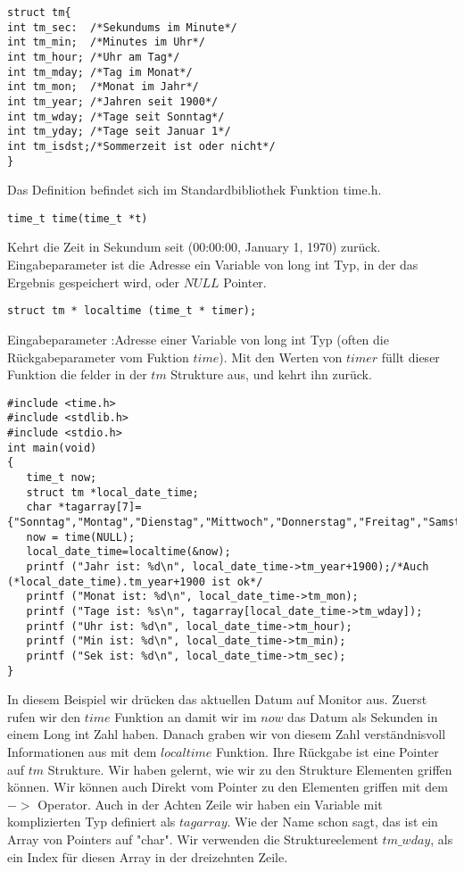 \documentclass{article}[12pt]
\newenvironment{myexampleblock}[1]{%
    \tcolorbox[beamer,%
    noparskip,breakable,
    colback=White,colframe=ForestGreen,%
    colbacklower=LimeGreen!75!White,%
    title=#1]}%
    {\endtcolorbox}
\begin{document}
\begin{myexampleblock}{Definition: \texttt{struct tm}}
\begin{lstlisting}
struct tm{
int tm_sec:  /*Sekundums im Minute*/
int tm_min;  /*Minutes im Uhr*/
int tm_hour; /*Uhr am Tag*/
int tm_mday; /*Tag im Monat*/
int tm_mon;  /*Monat im Jahr*/
int tm_year; /*Jahren seit 1900*/
int tm_wday; /*Tage seit Sonntag*/
int tm_yday; /*Tage seit Januar 1*/
int tm_isdst;/*Sommerzeit ist oder nicht*/
}
\end{lstlisting}
Das Definition befindet sich im Standardbibliothek Funktion time.h.
\end{myexampleblock}
\begin{myexampleblock}{Funktion:\texttt{time}}
\begin{lstlisting}
time_t time(time_t *t)
\end{lstlisting}
\vspace{-0.4cm}
Kehrt die Zeit in Sekundum seit (00:00:00, January 1, 1970) zurück.
Eingabeparameter ist die Adresse ein Variable von long int Typ, in der
das Ergebnis gespeichert wird, oder $NULL$ Pointer.
\end{myexampleblock}
\begin{myexampleblock}{Funktion:\texttt{localtime}}
\begin{lstlisting}
struct tm * localtime (time_t * timer);
\end{lstlisting}
\vspace{-0.4cm}
Eingabeparameter :Adresse einer Variable von long int Typ (often die Rückgabeparameter vom Fuktion $time$).
Mit den Werten von $timer$ füllt dieser Funktion die felder in der $tm$ Strukture aus, und kehrt ihn zurück.
\end{myexampleblock}
\begin{lstlisting}
#include <time.h>
#include <stdlib.h>
#include <stdio.h>
int main(void)
{
   time_t now;
   struct tm *local_date_time;
   char *tagarray[7]={"Sonntag","Montag","Dienstag","Mittwoch","Donnerstag","Freitag","Samstag"};
   now = time(NULL);
   local_date_time=localtime(&now);
   printf ("Jahr ist: %d\n", local_date_time->tm_year+1900);/*Auch (*local_date_time).tm_year+1900 ist ok*/
   printf ("Monat ist: %d\n", local_date_time->tm_mon);
   printf ("Tage ist: %s\n", tagarray[local_date_time->tm_wday]);
   printf ("Uhr ist: %d\n", local_date_time->tm_hour);
   printf ("Min ist: %d\n", local_date_time->tm_min);
   printf ("Sek ist: %d\n", local_date_time->tm_sec);
}
\end{lstlisting}
In diesem Beispiel wir drücken das aktuellen Datum auf Monitor aus. Zuerst rufen wir den $time$ Funktion
an damit wir  im $now$ das Datum als Sekunden in einem Long int Zahl haben. Danach graben wir von diesem Zahl 
verständnisvoll Informationen aus mit dem $localtime$ Funktion. Ihre Rückgabe ist eine Pointer auf $tm$ Strukture. 
Wir haben gelernt, wie wir zu den Strukture Elementen griffen können. Wir können auch Direkt vom Pointer
zu den Elementen griffen mit dem $->$ Operator. Auch in der Achten Zeile wir haben ein Variable mit komplizierten
Typ definiert als $tagarray$. Wie der Name schon sagt, das ist ein Array von Pointers auf "char". Wir verwenden
die Struktureelement $tm\_wday$, als ein Index für diesen Array in der dreizehnten Zeile.
\end{document}
